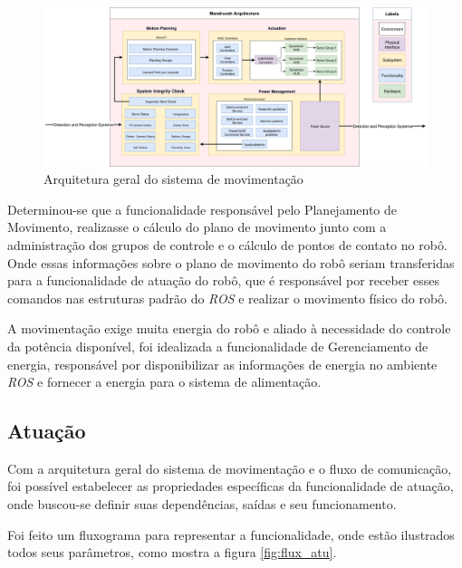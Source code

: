 \begin{figure}[H]
	\centering
	\includegraphics[scale=0.25]{Figures/Arquitetura.png}
	\caption{Arquitetura geral do sistema de movimentação}
	\label{fig:arq_geral}
\end{figure}
Determinou-se que a funcionalidade responsável pelo Planejamento de Movimento, realizasse o cálculo do plano de movimento junto com a administração dos grupos de controle e o cálculo de pontos de contato no robô. Onde essas informações sobre o plano de movimento do robô seriam transferidas para a funcionalidade de atuação do robô, que é responsável por receber esses comandos nas estruturas padrão do \textit{ROS} e realizar o movimento físico do robô.

A movimentação exige muita energia do robô e aliado à necessidade do controle da potência disponível, foi idealizada a funcionalidade de Gerenciamento de energia, responsável por disponibilizar as informações de energia no ambiente \textit{ROS} e fornecer a energia para o sistema de alimentação.

\subsection{Atuação}\label{sec:actuation}
Com a arquitetura geral do sistema de movimentação e o fluxo de comunicação, foi possível estabelecer as propriedades específicas da funcionalidade de atuação, onde buscou-se definir suas dependências, saídas e seu funcionamento.

Foi feito um fluxograma para representar a funcionalidade, onde estão ilustrados todos seus parâmetros, como mostra a figura \ref{fig:flux_atu}.

